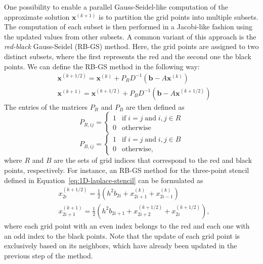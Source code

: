 One possibility to enable a parallel Gauss-Seidel-like computation of the approximate solution $\bm{x}^{(k+1)}$ is to partition the grid points into multiple subsets.
The computation of each subset is then performed in a Jacobi-like fashion using the updated values from other subsets.
A common variant of this approach is the \emph{red-black} Gauss-Seidel (RB-GS) method.
Here, the grid points are assigned to two distinct subsets, where the first represents the red and the second one the black points.
We can define the RB-GS method in the following way:
\begin{equation}
	\begin{split}
		& \bm{x}^{(k+1/2)} = \bm{x}^{(k)} + P_R D^{-1} (\bm{b} - A \bm{x}^{(k)}) \\
		& \bm{x}^{(k+1)} = \bm{x}^{(k+1/2)} + P_B D^{-1} (\bm{b} - A \bm{x}^{(k+1/2)})
	\end{split}
\end{equation}
The entries of the matrices $P_R$ and $P_B$ are then defined as
\begin{equation}
	P_{R,ij} = \begin{cases}
	1 & \text{if} \; i = j \; \text{and} \; i,j \in R \\
	0 & \text{otherwise} 
	\end{cases}
\end{equation}
\begin{equation}
	P_{B,ij} = \begin{cases}
		1 & \text{if} \; i = j \; \text{and} \; i,j \in B \\
		0 & \text{otherwise},
	\end{cases}
\end{equation}
where $R$ and $B$ are the sets of grid indices that correspond to the red and black points, respectively.
For instance, an RB-GS method for the three-point stencil defined in Equation~\eqref{eq:1D-laplace-stencil} can be formulated as
\begin{equation}
\begin{split}
   	& x_{2i}^{(k+1/2)} = \frac {1}{2}\left(h^2 b_{2i} + x_{2i+1}^{(k)} + x_{2i-1}^{(k)}\right) \\
    & x_{2i+1}^{(k+1)} = \frac {1}{2}\left(h^2 b_{2i+1} + x_{2i+2}^{(k+1/2)} + x_{2i}^{(k+1/2)}\right),
\end{split}
\end{equation}
where each grid point with an even index belongs to the red and each one with an odd index to the black points.
Note that the update of each grid point is exclusively based on its neighbors, which have already been updated in the previous step of the method.
